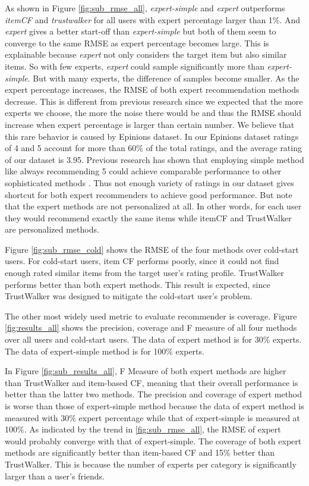 \documentclass[12pt]{article}
\begin{document}
As shown in Figure \ref{fig:sub_rmse_all}, \emph{expert-simple} and \emph{expert} outperforms \emph{itemCF} and \emph{trustwalker} for all users with expert percentage larger than 1\%. And \emph{expert} gives a better start-off than \emph{expert-simple} but both of them seem to converge to the same RMSE as expert percentage becomes large. This is explainable because \emph{expert} not only considers the target item but also similar items. So with few experts, \emph{expert} could sample significantly more than \emph{expert-simple}. But with many experts, the difference of samples become smaller. As the expert percentage increases, the RMSE of both expert recommendation methods decrease. This is different from previous research \cite{Sarwar:2001p433} since we expected that the more experts we choose, the more the noise there would be and thus the RMSE should increase when expert percentage is larger than certain number. We believe that this rare behavior is caused by Epinions dataset. In our Epinions dataset ratings of 4 and 5 account for more than 60\% of the total ratings, and the average rating of our dataset is 3.95. Previous research has shown that employing simple method like always recommending 5 could achieve comparable performance to other sophisticated methods \cite{Massa:2007p437}. Thus not enough variety of ratings in our dataset gives shortcut for both expert recommenders to achieve good performance. But note that the expert methods are not personalized at all. In other words, for each user they would recommend exactly the same items while itemCF and TrustWalker are personalized methods.


Figure \ref{fig:sub_rmse_cold} shows the RMSE of the four methods over cold-start users. For cold-start users, item CF performs poorly, since it could not find enough rated similar items from the target user's rating profile. TrustWalker performs better than both expert methods. This result is expected, since TrustWalker was designed to mitigate the cold-start user's problem.


The other most widely used metric to evaluate recommender is coverage. Figure \ref{fig:results_all} shows the precision, coverage and F measure of all four methods over all users and cold-start users. The data of expert method is for 30\% experts. The data of expert-simple method is for 100\% experts.

In Figure \ref{fig:sub_results_all}, F Measure of both expert methods are higher than TrustWalker and item-based CF, meaning that their overall performance is better than the latter two methods. The precision and coverage of expert method is worse than those of expert-simple method because the data of expert method is measured with 30\% expert percentage while that of expert-simple is measured at 100\%. As indicated by the trend in \ref{fig:sub_rmse_all}, the RMSE of expert would probably converge with that of expert-simple. The coverage of both expert methods are significantly better than item-based CF and 15\% better than TrustWalker. This is because the number of experts per category is significantly larger than a user's friends.
\end{document}
